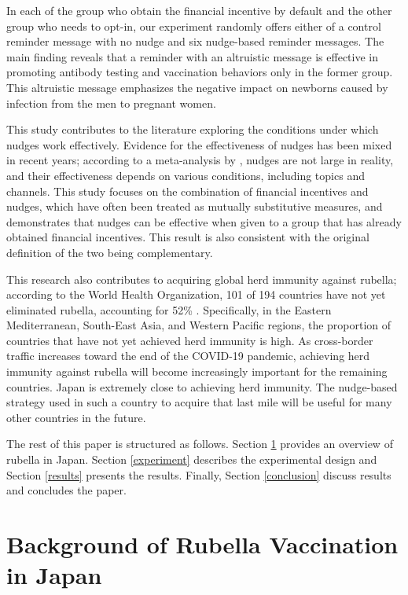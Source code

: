 \documentclass[
]{article}
\begin{document}
In each of the group who obtain the financial incentive by default and the other group who needs to opt-in, our experiment randomly offers either of a control reminder message with no nudge and six nudge-based reminder messages. The main finding reveals that a reminder with an altruistic message is effective in promoting antibody testing and vaccination behaviors only in the former group. This altruistic message emphasizes the negative impact on newborns caused by infection from the men to pregnant women.

This study contributes to the literature exploring the conditions under which nudges work effectively. Evidence for the effectiveness of nudges has been mixed in recent years; according to a meta-analysis by \citet{DellaVigna2022a}, nudges are not large in reality, and their effectiveness depends on various conditions, including topics and channels. This study focuses on the combination of financial incentives and nudges, which have often been treated as mutually substitutive measures, and demonstrates that nudges can be effective when given to a group that has already obtained financial incentives. This result is also consistent with the original definition of the two being complementary.

This research also contributes to acquiring global herd immunity against rubella; according to the World Health Organization, 101 of 194 countries have not yet eliminated rubella, accounting for 52\% \citep{Zimmerman2022}. Specifically, in the Eastern Mediterranean, South-East Asia, and Western Pacific regions, the proportion of countries that have not yet achieved herd immunity is high. As cross-border traffic increases toward the end of the COVID-19 pandemic, achieving herd immunity against rubella will become increasingly important for the remaining countries. Japan is extremely close to achieving herd immunity. The nudge-based strategy used in such a country to acquire that last mile will be useful for many other countries in the future.

The rest of this paper is structured as follows. Section \ref{background} provides an overview of rubella in Japan. Section \ref{experiment} describes the experimental design and Section \ref{results} presents the results. Finally, Section \ref{conclusion} discuss results and concludes the paper.

\hypertarget{background}{%
\section{Background of Rubella Vaccination in Japan}\label{background}}
\end{document}
